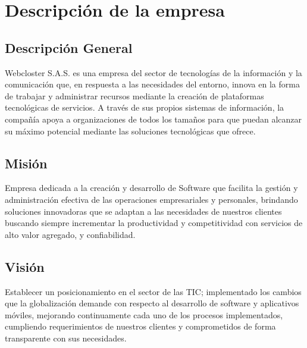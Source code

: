 \section{Descripción de la empresa}

\subsection{Descripción General}
Webcloster S.A.S. es una empresa del sector de tecnologías de la información y la comunicación que, en respuesta a las necesidades del entorno, innova en la forma de trabajar y administrar recursos mediante la creación de plataformas tecnológicas de servicios. A través de sus propios sistemas de información, la compañía apoya a organizaciones de todos los tamaños para que puedan alcanzar su máximo potencial mediante las soluciones tecnológicas que ofrece.

\subsection{Misión}
Empresa dedicada a la creación y desarrollo de Software que facilita la gestión y administración efectiva de las operaciones empresariales y personales, brindando soluciones innovadoras que se adaptan a las necesidades de nuestros clientes buscando siempre incrementar la productividad y competitividad con servicios de alto valor agregado, y confiabilidad.

\subsection{Visión}
Establecer un posicionamiento en el sector de las TIC; implementado los cambios que la globalización demande con respecto al desarrollo de software y aplicativos móviles, mejorando continuamente cada uno de los procesos implementados, cumpliendo requerimientos de nuestros clientes y comprometidos de forma transparente con sus necesidades.

